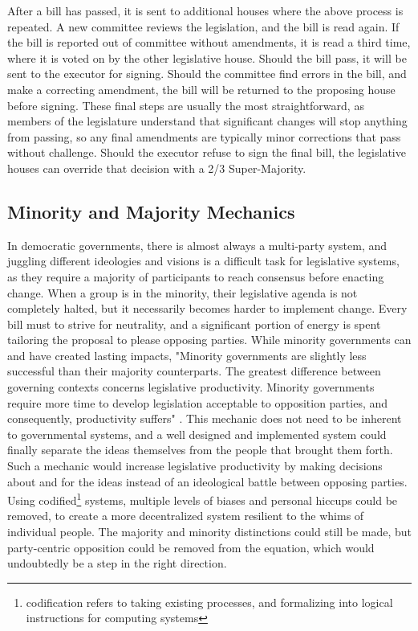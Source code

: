 \documentclass[letterpaper,twocolumn]{article}
\begin{document}
After a bill has passed, it is sent to additional houses where the above process is repeated.  A new committee reviews the legislation, and the bill is read again.  If the bill is reported out of committee without amendments, it is read a third time, where it is voted on by the other legislative house.  Should the bill pass, it will be sent to the executor for signing.  Should the committee find errors in the bill, and make a correcting amendment, the bill will be returned to the proposing house before signing.  These final steps are usually the most straightforward, as members of the legislature understand that significant changes will stop anything from passing, so any final amendments are typically minor corrections that pass without challenge.  Should the executor refuse to sign the final bill, the legislative houses can override that decision with a 2/3 Super-Majority.

\subsection*{Minority and Majority Mechanics}

In democratic governments, there is almost always a multi-party system, and juggling different ideologies and visions is a difficult task for legislative systems, as they require a majority of participants to reach consensus before enacting change.  When a group is in the minority, their legislative agenda is not completely halted, but it necessarily becomes harder to implement change.  Every bill must to strive for neutrality, and a significant portion of energy is spent tailoring the proposal to please opposing parties.  While minority governments can and have created lasting impacts, "Minority governments are slightly less successful than their majority counterparts. The greatest difference between governing contexts concerns legislative productivity. Minority governments require more time to develop legislation acceptable to opposition parties, and consequently, productivity suffers" \cite{Minority_Article}.  This mechanic does not need to be inherent to governmental systems, and a well designed and implemented system could finally separate the ideas themselves from the people that brought them forth. Such a mechanic would increase legislative productivity by making decisions about and for the ideas instead of an ideological battle between opposing parties.  Using codified\footnote{codification refers to taking existing processes, and formalizing into logical instructions for computing systems} systems, multiple levels of biases and personal hiccups could be removed, to create a more decentralized system resilient to the whims of individual people.  The majority and minority distinctions could still be made, but party-centric opposition could be removed from the equation, which would undoubtedly be a step in the right direction.
\end{document}
